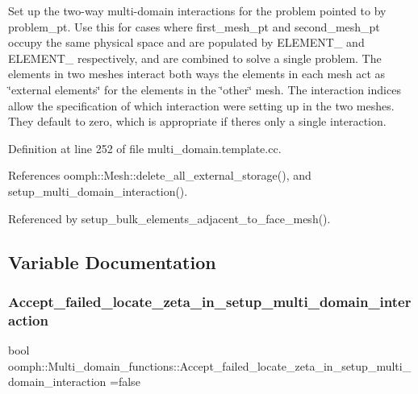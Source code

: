 Set up the two-\/way multi-\/domain interactions for the problem pointed to by {\ttfamily problem\+\_\+pt}. Use this for cases where first\+\_\+mesh\+\_\+pt and second\+\_\+mesh\+\_\+pt occupy the same physical space and are populated by E\+L\+E\+M\+E\+N\+T\+\_ and E\+L\+E\+M\+E\+N\+T\+\_ respectively, and are combined to solve a single problem. The elements in two meshes interact both ways the elements in each mesh act as \char`\"{}external elements\char`\"{} for the elements in the \char`\"{}other\char`\"{} mesh. The interaction indices allow the specification of which interaction we\textquotesingle{}re setting up in the two meshes. They default to zero, which is appropriate if there\textquotesingle{}s only a single interaction. 

Definition at line 252 of file multi\+\_\+domain.\+template.\+cc.



References oomph\+::\+Mesh\+::delete\+\_\+all\+\_\+external\+\_\+storage(), and setup\+\_\+multi\+\_\+domain\+\_\+interaction().



Referenced by setup\+\_\+bulk\+\_\+elements\+\_\+adjacent\+\_\+to\+\_\+face\+\_\+mesh().



\subsection{Variable Documentation}
\mbox{\label{namespaceoomph_1_1Multi__domain__functions_af4e0a3d3191c370209c6a7830a0dc368}} 
\subsubsection{\texorpdfstring{Accept\+\_\+failed\+\_\+locate\+\_\+zeta\+\_\+in\+\_\+setup\+\_\+multi\+\_\+domain\+\_\+interaction}{Accept\_failed\_locate\_zeta\_in\_setup\_multi\_domain\_interaction}}
{\footnotesize\ttfamily bool oomph\+::\+Multi\+\_\+domain\+\_\+functions\+::\+Accept\+\_\+failed\+\_\+locate\+\_\+zeta\+\_\+in\+\_\+setup\+\_\+multi\+\_\+domain\+\_\+interaction =false}



